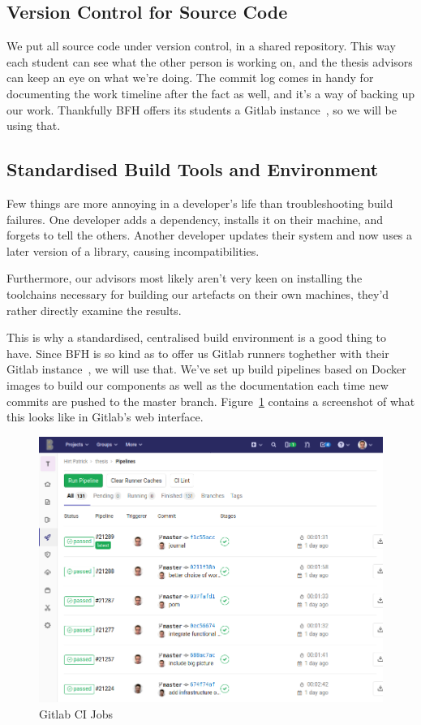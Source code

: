 \subsection{Version Control for Source Code}\label{subsec:version-control-for-source-code}
We put all source code under version control, in a shared repository.
This way each student can see what the other person is working on,
and the thesis advisors can keep an eye on what we're doing.
The commit log comes in handy for documenting the work timeline after the fact as well,
and it's a way of backing up our work.
Thankfully \gls{BFH} offers its students a Gitlab instance~\cite{gitlab}, so we will be using that.

\subsection{Standardised Build Tools and Environment}\label{subsec:standardised-build-tools-and-environment}
Few things are more annoying in a developer's life than troubleshooting build failures.
One developer adds a dependency, installs it on their machine, and forgets to tell the others.
Another developer updates their system and now uses a later version of a library, causing incompatibilities.

Furthermore,
our advisors most likely aren't very keen on installing the toolchains necessary for building our artefacts on their own machines,
they'd rather directly examine the results.

This is why a standardised, centralised build environment is a good thing to have.
Since \gls{BFH} is so kind as to offer us Gitlab runners toghether with their Gitlab instance~\cite{gitlab},
we will use that.
We've set up build pipelines based on Docker images to build our components as well as the documentation each time new commits are pushed to the master branch.
Figure~\ref{fig:gitlabcijobs} contains a screenshot of what this looks like in Gitlab's web interface.

\begin{figure}
    \begin{center}
        \includegraphics[width=0.8\linewidth]{images/gitlabcijobs.png}
        \caption{Gitlab CI Jobs}
        \label{fig:gitlabcijobs}
    \end{center}
\end{figure}

